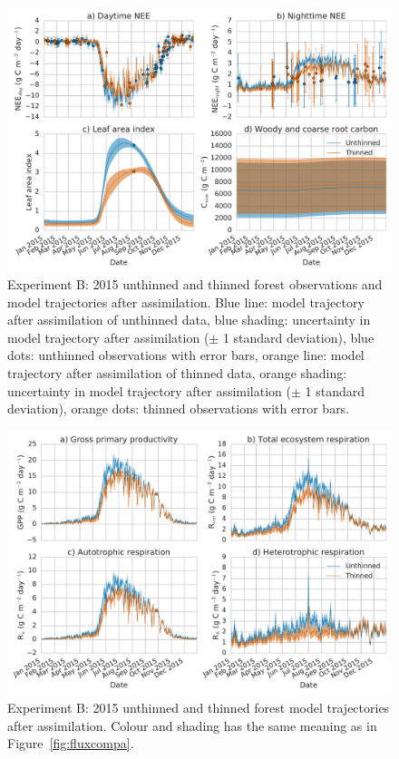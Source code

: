  \begin{figure}
 \noindent\includegraphics[width=40pc]{chapter/chapter7/obs_compb.pdf}
\caption{Experiment B: 2015 unthinned and thinned forest observations and model trajectories after assimilation. Blue line: model trajectory after assimilation of unthinned data, blue shading: uncertainty in model trajectory after assimilation (\(\pm\) 1 standard deviation), blue dots: unthinned observations with error bars, orange line: model trajectory after assimilation of thinned data, orange shading: uncertainty in model trajectory after assimilation (\(\pm\) 1 standard deviation), orange dots: thinned observations with error bars.}
 \label{fig:obscompb}
 \end{figure}
 
 
 \begin{figure}
 \noindent\includegraphics[width=40pc]{chapter/chapter7/flux_compb.pdf}
\caption{Experiment B: 2015 unthinned and thinned forest model trajectories after assimilation. Colour and shading has the same meaning as in Figure~\ref{fig:fluxcompa}.}
 \label{fig:fluxcompb}
 \end{figure}
 
